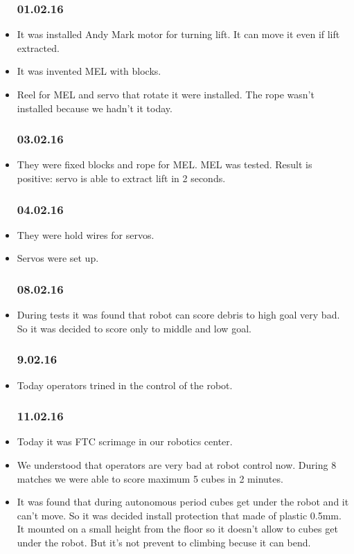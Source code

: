 \begin{itemize}
	\subsubsection{01.02.16}		
		\item It was installed Andy Mark motor for turning lift. It can move it even if lift extracted.
		\item It was invented MEL with blocks.
		\item Reel for MEL and servo that rotate it were installed. The rope wasn't installed because we hadn't it today.
	\subsubsection{03.02.16}
		\item They were fixed blocks and rope for MEL. MEL was tested. Result is positive: servo is able to extract lift in 2 seconds.
	\subsubsection{04.02.16}
		\item They were hold wires for servos.
		\item Servos were set up.
	\subsubsection{08.02.16}
		\item During tests it was found that robot can score debris to high goal very bad. So it was decided to score only to middle and low goal.	
	\subsubsection{9.02.16}
		\item Today operators trined in the control of the robot. 
	\subsubsection{11.02.16}	 
		\item Today it was FTC scrimage in our robotics center.
		
		\item We understood that operators are very bad at robot control now. During 8 matches we were able to score maximum 5 cubes in 2 minutes.
		
		\item It was found that during autonomous period cubes get under the robot and it can't move. So it was decided install protection that made of plastic 0.5mm. It mounted on a small height from the floor so it doesn't allow to cubes get under the robot. But it's not prevent to climbing becuse it can bend.

\end{itemize}
